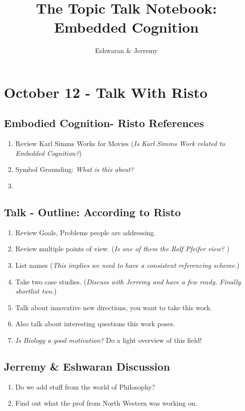 \documentclass[11pt]{article}
\begin{document}
\title{The Topic Talk Notebook: Embedded Cognition}
\author{Eshwaran \& Jerremy}
\maketitle
\section{October 12 - Talk With Risto}
\subsection{Embodied Cognition- Risto References}
\begin{enumerate}
  \item Review Karl Simms Works for Movies (\textit{Is Karl Simms Work related to Embedded Cognition?})
  \item Symbol Grounding: \textit{What is this about?}
  \item 
\end{enumerate}
\subsection{Talk - Outline: According to Risto}
\begin{enumerate}
  \item Review Goals, Problems people are addressing.
  \item Review multiple points of view. (\textit{Is one of them the Rolf Pfeifer view?  })
  \item List names (\textit{This implies we need to have a consistent referencing scheme.})
  \item Take two case studies. (\textit{Discuss with Jerremy and have a few ready. Finally shortlist two.})
  \item Talk about innovative new directions, you want to take this work.
  \item Also talk about interesting questions this work poses.
  \item\textit{ Is Biology a good motivation?} Do a light overview of this field!
\end{enumerate}
\subsection {Jerremy \& Eshwaran Discussion}
\begin{enumerate}
  \item Do we add stuff from the world of Philosophy?
  \item Find out what the prof from North Western was working on.
\end{enumerate}
\end{document}
